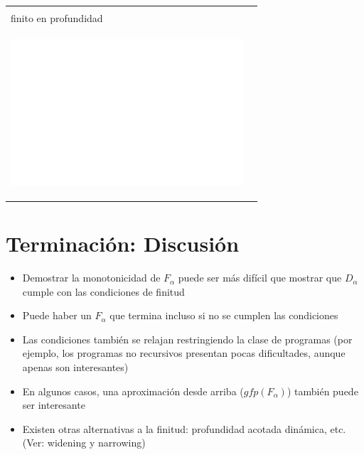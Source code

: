 \documentclass[11pt]{article}
\begin{document}
\begin{center}
\begin{tabular}{ll}
\begin{center}
\end{center}\\
finito en profundidad & \\
\begin{center}
\includegraphics[width=.9\linewidth]{finitedepht2.png}
\end{center} & \\
\end{tabular}
\end{center}


\section*{Terminación: Discusión}
\label{sec:orgf2c011e}
\begin{itemize}
\item Demostrar la monotonicidad de \(F_\alpha\) puede ser más difícil que
mostrar que \(D_\alpha\) cumple con las condiciones de finitud
\item Puede haber un \(F_\alpha\) que termina incluso si no se cumplen las condiciones
\item Las condiciones también se relajan restringiendo la clase de
programas (por ejemplo, los programas no recursivos presentan pocas dificultades, aunque apenas son interesantes)
\item En algunos casos, una aproximación desde arriba (\(gfp(F_\alpha)\)) también puede ser interesante
\item Existen otras alternativas a la finitud: profundidad acotada
dinámica, etc. (Ver: widening y narrowing)
\end{itemize}
\end{document}
